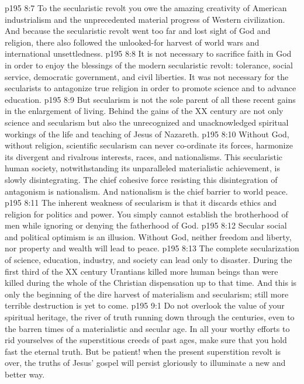 \vs p195 8:7 To the secularistic revolt you owe the amazing creativity of American industrialism and the unprecedented material progress of Western civilization. And because the secularistic revolt went too far and lost sight of God and  religion, there also followed the unlooked\hyp{}for harvest of world wars and international unsettledness.
\vs p195 8:8 It is not necessary to sacrifice faith in God in order to enjoy the blessings of the modern secularistic revolt: tolerance, social service, democratic government, and civil liberties. It was not necessary for the secularists to antagonize true religion in order to promote science and to advance education.
\vs p195 8:9 But secularism is not the sole parent of all these recent gains in the enlargement of living. Behind the gains of the XX century are not only science and secularism but also the unrecognized and unacknowledged spiritual workings of the life and teaching of Jesus of Nazareth.
\vs p195 8:10 Without God, without religion, scientific secularism can never co\hyp{}ordinate its forces, harmonize its divergent and rivalrous interests, races, and nationalisms. This secularistic human society, notwithstanding its unparalleled materialistic achievement, is slowly disintegrating. The chief cohesive force resisting this disintegration of antagonism is nationalism. And nationalism is the chief barrier to world peace.
\vs p195 8:11 The inherent weakness of secularism is that it discards ethics and religion for politics and power. You simply cannot establish the brotherhood of men while ignoring or denying the fatherhood of God.
\vs p195 8:12 Secular social and political optimism is an illusion. Without God, neither freedom and liberty, nor property and wealth will lead to peace.
\vs p195 8:13 The complete secularization of science, education, industry, and society can lead only to disaster. During the first third of the XX century Urantians killed more human beings than were killed during the whole of the Christian dispensation up to that time. And this is only the beginning of the dire harvest of materialism and secularism; still more terrible destruction is yet to come.
\vs p195 9:1 Do not overlook the value of your spiritual heritage, the river of truth running down through the centuries, even to the barren times of a materialistic and secular age. In all your worthy efforts to rid yourselves of the superstitious creeds of past ages, make sure that you hold fast the eternal truth. But be patient! when the present superstition revolt is over, the truths of Jesus’ gospel will persist gloriously to illuminate a new and better way.
